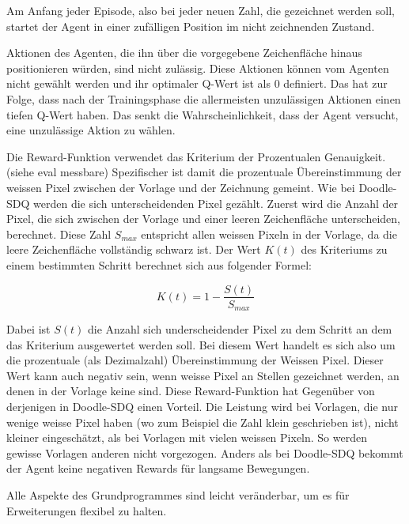 Am Anfang jeder Episode, also bei jeder neuen Zahl, die gezeichnet werden soll,
startet der Agent in einer zufälligen Position im nicht zeichnenden Zustand.

Aktionen des Agenten, die ihn über die vorgegebene Zeichenfläche hinaus
positionieren würden, sind nicht zulässig. Diese Aktionen können vom Agenten
nicht gewählt werden und ihr optimaler Q-Wert ist als $0$ definiert. Das hat zur
Folge, dass nach der Trainingsphase die allermeisten unzulässigen Aktionen einen
tiefen Q-Wert haben. Das senkt die Wahrscheinlichkeit, dass der Agent versucht,
eine unzulässige Aktion zu wählen.

Die Reward-Funktion verwendet das Kriterium der Prozentualen Genauigkeit. (siehe eval messbare)  %
Spezifischer ist damit die prozentuale Übereinstimmung der weissen Pixel
zwischen der Vorlage und der Zeichnung gemeint. Wie bei Doodle-SDQ werden die
sich unterscheidenden Pixel gezählt. Zuerst wird die Anzahl der Pixel, die sich
zwischen der Vorlage und einer leeren Zeichenfläche unterscheiden, berechnet.
Diese Zahl $S_{max}$ entspricht allen weissen Pixeln in der Vorlage, da die
leere Zeichenfläche vollständig schwarz ist. Der Wert $K(t)$ des Kriteriums zu
einem bestimmten Schritt berechnet sich aus folgender Formel: 

$$ K(t) = 1 - \frac{S(t)}{S_{max}} $$  %

Dabei ist $S(t)$ die Anzahl sich underscheidender Pixel zu dem Schritt an dem
das Kriterium ausgewertet werden soll. Bei diesem Wert handelt es sich also um
die prozentuale (als Dezimalzahl) Übereinstimmung der Weissen Pixel. Dieser Wert
kann auch negativ sein, wenn weisse Pixel an Stellen gezeichnet werden, an denen
in der Vorlage keine sind. Diese Reward-Funktion hat Gegenüber von derjenigen in
Doodle-SDQ einen Vorteil. Die Leistung wird bei Vorlagen, die nur wenige weisse
Pixel haben (wo zum Beispiel die Zahl klein geschrieben ist), nicht kleiner
eingeschätzt, als bei Vorlagen mit vielen weissen Pixeln. So werden gewisse
Vorlagen anderen nicht vorgezogen. Anders als bei Doodle-SDQ bekommt der Agent
keine negativen Rewards für langsame Bewegungen. 

Alle Aspekte des Grundprogrammes sind leicht veränderbar, um es für
Erweiterungen flexibel zu halten.

